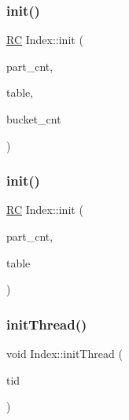 \subsubsection{\texorpdfstring{init()}{init()}\hspace{0.1cm}{\footnotesize\ttfamily [2/3]}}
{\footnotesize\ttfamily \hyperlink{global_8h_a78c49a674c810fdd03d20432f7be864a}{RC} Index\+::init (\begin{DoxyParamCaption}\item[{int}]{part\+\_\+cnt,  }\item[{\hyperlink{classtable__t}{table\+\_\+t} $\ast$}]{table,  }\item[{uint64\+\_\+t}]{bucket\+\_\+cnt }\end{DoxyParamCaption})}

\mbox{\label{classIndex_a1328ba545ab4ef6750a742f0de084d79}} 
\subsubsection{\texorpdfstring{init()}{init()}\hspace{0.1cm}{\footnotesize\ttfamily [3/3]}}
{\footnotesize\ttfamily \hyperlink{global_8h_a78c49a674c810fdd03d20432f7be864a}{RC} Index\+::init (\begin{DoxyParamCaption}\item[{uint64\+\_\+t}]{part\+\_\+cnt,  }\item[{\hyperlink{classtable__t}{table\+\_\+t} $\ast$}]{table }\end{DoxyParamCaption})\hspace{0.3cm}{\ttfamily [inline]}}

\mbox{\label{classIndex_a6a509df225912ffea8547fa0daa57d8c}} 
\subsubsection{\texorpdfstring{init\+Thread()}{initThread()}\hspace{0.1cm}{\footnotesize\ttfamily [1/2]}}
{\footnotesize\ttfamily void Index\+::init\+Thread (\begin{DoxyParamCaption}\item[{const int}]{tid }\end{DoxyParamCaption})}


